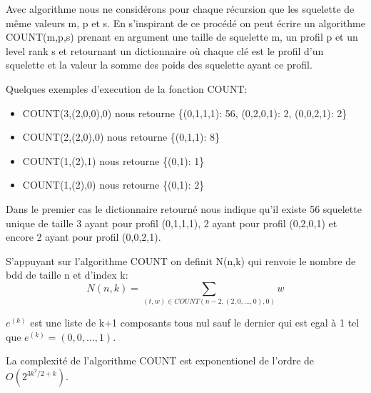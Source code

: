 \documentclass[french]{article}
\begin{document}
Avec algorithme nous ne considérons pour chaque récursion que les squelette de même valeurs m, p et s. 
En s'inspirant de ce procédé on peut écrire un algorithme COUNT(m,p,s) prenant en argument une taille de squelette m, un profil p et un level rank s et retournant un dictionnaire où chaque clé est le profil d'un squelette et la valeur la somme des poids des squelette ayant ce profil. 

Quelques exemples d'execution de la fonction COUNT:
\begin{itemize}
    \item COUNT(3,(2,0,0),0) nous retourne \{(0,1,1,1): 56, (0,2,0,1): 2, (0,0,2,1): 2\}
    \item COUNT(2,(2,0),0) nous retourne  \{(0,1,1): 8\}
    \item COUNT(1,(2),1) nous retourne \{(0,1): 1\}
    \item COUNT(1,(2),0) nous retourne \{(0,1): 2\}
\end{itemize}

Dans le premier cas le dictionnaire retourné nous indique qu'il existe 56 squelette unique de taille 3 ayant pour profil (0,1,1,1), 2 ayant pour profil (0,2,0,1) et encore 2 ayant pour profil (0,0,2,1).

\vspace{5mm} 

S'appuyant sur l'algorithme COUNT on definit N(n,k) qui renvoie le nombre de bdd de taille n et d'index k:
\[N(n,k)=\underset{(t,w)\in COUNT(n-2,(2,0,...,0),0)}{\sum} w\]

\(e^{(k)}\) est une liste de k+1 composants tous nul sauf le dernier qui est egal à 1 tel que \(e^{(k)} = (0,0,...,1)\).

La complexité de l'algorithme COUNT est exponentionel de l'ordre de \(O(2^{3k^2/2+k})\).
\end{document}
